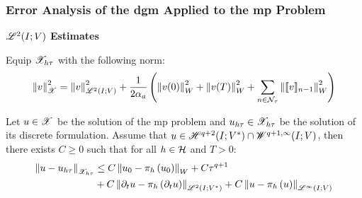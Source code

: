 \begin{frame}
    \frametitle{Error Analysis of the \acrshort{dgm} Applied to the \acrshort{mp} Problem}

    \vspace*{\fill}
    \begin{center}
        {\color{\accentcolor} \Large $\mathscr{L}^{2}(I; V)$ \textbf{Estimates}}
        \vspace*{0.25cm}

        \begin{minipage}{0.75\textwidth}
            \begin{definition}
                Equip $\mathscr{X}_{h \tau}$ with the following norm:
                \begin{align*}
                    \left\lVert v \right\rVert_{\mathscr{X}}^2 = \left\lVert v \right\rVert_{\mathscr{L}^{2}(I; V)}^2 + \frac{1}{2 \alpha_{a}} \left( \left\lVert v(0) \right\rVert_W^2 + \left\lVert v(T) \right\rVert_W^2 + \sum_{n \in \mathcal{N}_{\tau}} \left\lVert \llbracket v \rrbracket_{n - 1} \right\rVert_W^2 \right)
                \end{align*}
            \end{definition}
        \end{minipage}
    \end{center}

    \vspace*{\fill}

    \begin{center}
        \begin{minipage}{0.75\textwidth}
            \begin{theorem}
                Let $u \in \mathscr{X}$ be the solution of the \acrshort{mp} problem and $u_{h \tau} \in \mathscr{X}_{h \tau}$ be the solution of its discrete formulation. Assume that $u \in \mathscr{H}^{q + 2}(I; V^*) \cap \mathscr{W}^{q + 1, \infty}(I; V)$, then there exists $C \geq 0$ such that for all $h \in \mathcal{H}$ and $T > 0$:
                \begin{align*}
                    \left\lVert u - u_{h \tau} \right\rVert_{\mathscr{X}_{h \tau}} & \leq C \left\lVert u_0 - \pi_h \left( u_0 \right) \right\rVert_W + C \tau^{q + 1} \\
                    & + C \left\lVert \partial_t u - \pi_h \left( \partial_t u \right) \right\rVert_{\mathscr{L}^{2}(I; V^*)} + C \left\lVert u - \pi_h \left( u \right) \right\rVert_{\mathscr{L}^{\infty}(I; V)}
                \end{align*}
            \end{theorem}
        \end{minipage}
    \end{center}
    \vspace*{\fill}
    
\end{frame}

